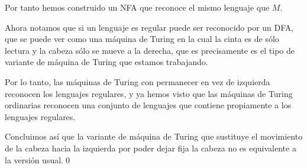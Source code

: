 \documentclass{article}
\begin{document}
Por tanto hemos construido un NFA que reconoce el mismo lenguaje que $M$.

Ahora notamos que si un lenguaje es regular puede ser reconocido por un DFA, que se puede ver como una máquina de Turing en la cual la cinta es de sólo lectura y la cabeza sólo se mueve a la derecha, que es precisamente es el tipo de variante de máquina de Turing que estamos trabajando. 

Por lo tanto, las máquinas de Turing con permanecer en vez de izquierda reconocen los lenguajes regulares, y ya hemos visto que las máquinas de Turing ordinarias reconocen una conjunto  de lenguajes que contiene propiamente a los lenguajes regulares. 

Concluimos así que la variante de máquina de Turing que sustituye el movimiento de la cabeza hacia la izquierda por poder dejar fija la cabeza no es equivalente a la versión usual.\qed
\end{document}
